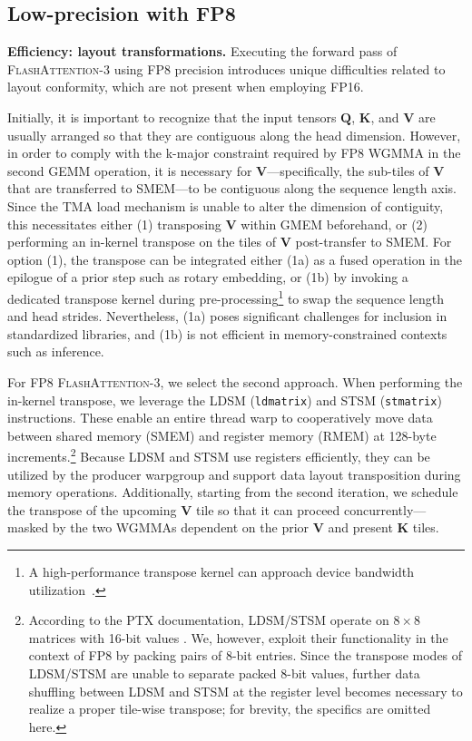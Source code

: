 \subsection{Low-precision with FP8}
\label{sec:algofp8}

\textbf{Efficiency: layout transformations.} Executing the forward pass of \textsc{FlashAttention-3} using FP8 precision introduces unique difficulties related to layout conformity, which are not present when employing FP16.

Initially, it is important to recognize that the input tensors $\mathbf{Q}$, $\mathbf{K}$, and $\mathbf{V}$ are usually arranged so that they are contiguous along the head dimension. However, in order to comply with the k-major constraint required by FP8 WGMMA in the second GEMM operation, it is necessary for $\mathbf{V}$—specifically, the sub-tiles of $\mathbf{V}$ that are transferred to SMEM—to be contiguous along the sequence length axis. Since the TMA load mechanism is unable to alter the dimension of contiguity, this necessitates either (1) transposing $\mathbf{V}$ within GMEM beforehand, or (2) performing an in-kernel transpose on the tiles of $\mathbf{V}$ post-transfer to SMEM. For option (1), the transpose can be integrated either (1a) as a fused operation in the epilogue of a prior step such as rotary embedding, or (1b) by invoking a dedicated transpose kernel during pre-processing\footnote{A high-performance transpose kernel can approach device bandwidth utilization~\citep{colfax_cutlass_transpose_2024}.} to swap the sequence length and head strides. Nevertheless, (1a) poses significant challenges for inclusion in standardized libraries, and (1b) is not efficient in memory-constrained contexts such as inference.

For FP8 \textsc{FlashAttention-3}, we select the second approach. When performing the in-kernel transpose, we leverage the LDSM (\verb|ldmatrix|) and STSM (\verb|stmatrix|) instructions. These enable an entire thread warp to cooperatively move data between shared memory (SMEM) and register memory (RMEM) at 128-byte increments.\footnote{According to the PTX documentation, LDSM/STSM operate on $8 \times 8$ matrices with 16-bit values \cite[\S 9.7.13.4.15-16]{ptx}. We, however, exploit their functionality in the context of FP8 by packing pairs of 8-bit entries. Since the transpose modes of LDSM/STSM are unable to separate packed 8-bit values, further data shuffling between LDSM and STSM at the register level becomes necessary to realize a proper tile-wise transpose; for brevity, the specifics are omitted here.} Because LDSM and STSM use registers efficiently, they can be utilized by the producer warpgroup and support data layout transposition during memory operations. Additionally, starting from the second iteration, we schedule the transpose of the upcoming $\mathbf{V}$ tile so that it can proceed concurrently—masked by the two WGMMAs dependent on the prior $\mathbf{V}$ and present $\mathbf{K}$ tiles.

